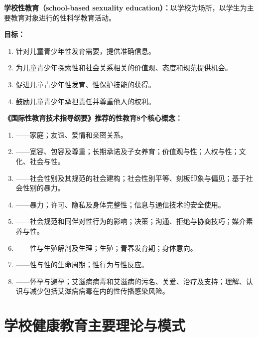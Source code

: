 \begin{keybox}
\textbf{学校性教育（school-based sexuality education）：}以学校为场所，以学生为主要教育对象进行的性科学教育活动。

\textbf{目标：}
\begin{enumerate}[leftmargin=*]
    \item 针对儿童青少年性发育需要，提供准确信息。
    \item 为儿童青少年探索性和社会关系相关的价值观、态度和规范提供机会。
    \item 促进儿童青少年性发育、性保护技能的获得。
    \item 鼓励儿童青少年承担责任并尊重他人的权利。
\end{enumerate}

\textbf{《国际性教育技术指导纲要》推荐的性教育8个核心概念：}
\begin{enumerate}[leftmargin=*]
    \item {}——家庭；友谊、爱情和亲密关系。
    \item {}——宽容、包容及尊重；长期承诺及子女养育；价值观与性；人权与性；文化、社会与性。
    \item {}——社会性别及其规范的社会建构；社会性别平等、刻板印象与偏见；基于社会性别的暴力。
    \item {}——暴力；许可、隐私及身体完整性；信息与通信技术的安全使用。
    \item {}——社会规范和同伴对性行为的影响；决策；沟通、拒绝与协商技巧；媒介素养与性。
    \item {}——性与生殖解剖及生理；生殖；青春发育期；身体意向。
    \item {}——性与性的生命周期；性行为与性反应。
    \item {}——怀孕与避孕；艾滋病病毒和艾滋病的污名、关爱、治疗及支持；理解、认识与减少包括艾滋病病毒在内的性传播感染风险。
\end{enumerate}
\end{keybox}

\newpage

\section{学校健康教育主要理论与模式}

